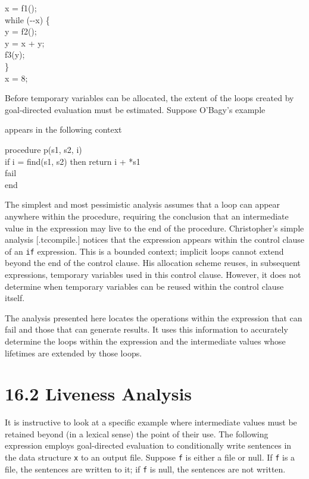 \goodbreak
\begin{iconcode}
x = f1();\\
while (-{}-x) \{\\
\>y = f2();\\
\>y = x + y;\\
\>f3(y);\\
\>\}\\
x = 8;\\
\end{iconcode}

Before temporary variables can be allocated, the extent of the loops
created by goal-directed evaluation must be estimated. Suppose
O'Bagy's example


\noindent
appears in the following context 

\goodbreak
\begin{iconcode}
procedure p(s1, s2, i)\\
\>if i = find(s1, s2) then return i + *s1\\
\>fail\\
end\\
\end{iconcode}

The simplest and most pessimistic analysis assumes that a loop can
appear anywhere within the procedure, requiring the conclusion that an
intermediate value in the expression may live to the end of the
procedure. Christopher's simple analysis [.tccompile.] notices that
the expression appears within the control clause of an \texttt{if}
expression. This is a bounded context; implicit loops cannot extend
beyond the end of the control clause. His allocation scheme reuses, in
subsequent expressions, temporary variables used in this control
clause. However, it does not determine when temporary variables can be
reused within the control clause itself.

The analysis presented here locates the operations within the
expression that can fail and those that can generate results. It uses
this information to accurately determine the loops within the
expression and the intermediate values whose lifetimes are extended by
those loops.


\section[16.2 Liveness Analysis]{16.2 Liveness Analysis}

It is instructive to look at a specific example where intermediate
values must be retained beyond (in a lexical sense) the point of their
use. The following expression employs goal-directed evaluation to
conditionally write sentences in the data structure \texttt{x} to an output
file. Suppose \texttt{f} is either a file or null. If \texttt{f} is a file, the
sentences are written to it; if \texttt{f} is null, the sentences are not
written.

